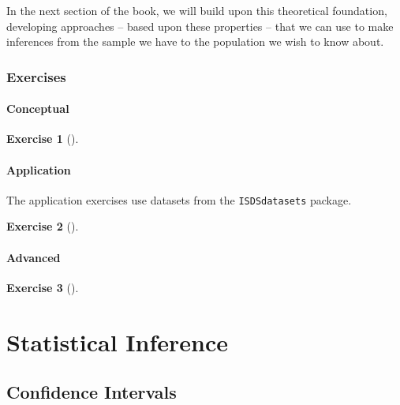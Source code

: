 \documentclass[
  letterpaper,
  DIV=11,
  numbers=noendperiod]{scrreprt}
\theoremstyle{definition}
\newtheorem{exercise}{Exercise}[chapter]
\theoremstyle{remark}
\begin{document}
In the next section of the book, we will build upon this theoretical
foundation, developing approaches -- based upon these properties -- that
we can use to make inferences from the sample we have to the population
we wish to know about.

\hypertarget{sec-ex09}{%
\section{Exercises}\label{sec-ex09}}

\hypertarget{sec-ex09-conceptual}{%
\subsection{Conceptual}\label{sec-ex09-conceptual}}

\leavevmode{}%
\begin{exercise}[]\label{exr-ch09-c01}

\end{exercise}

\hypertarget{sec-ex09-application}{%
\subsection{Application}\label{sec-ex09-application}}

The application exercises use datasets from the \texttt{ISDSdatasets}
package.

\leavevmode{}%
\begin{exercise}[]\label{exr-ch09-app1}

\end{exercise}

\hypertarget{sec-ex09-advanced}{%
\subsection{Advanced}\label{sec-ex09-advanced}}

\leavevmode{}%
\begin{exercise}[]\label{exr-ch09-adv1}

\end{exercise}

\part{Statistical Inference}

\hypertarget{sec-confidence-int}{%
\chapter{Confidence Intervals}\label{sec-confidence-int}}
\end{document}

